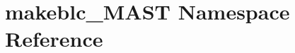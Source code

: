 \hypertarget{namespacemakeblc__MAST}{\section{makeblc\-\_\-\-M\-A\-S\-T Namespace Reference}
\label{namespacemakeblc__MAST}
}
